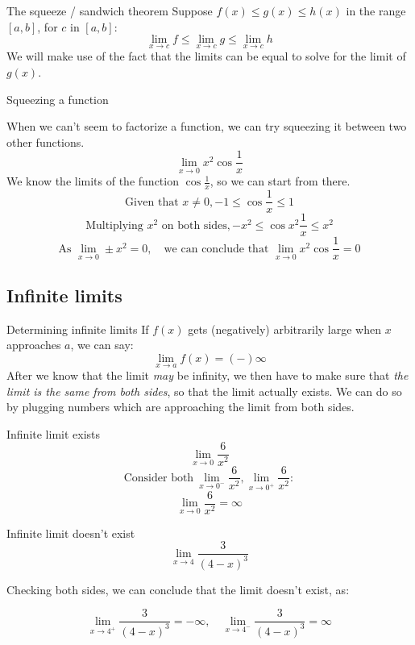 \documentclass{article}
\begin{document}
\begin{theorem}
  {The squeeze / sandwich theorem}
  Suppose $f(x)\le g(x) \le h(x)$ in the range $[a, b]$, for $c$ in $[a, b]$:
  \[\lim_{x\to c}f \le \lim_{x\to c}g \le \lim_{x\to c}h\]
  We will make use of the fact that the limits can be equal to solve for the limit of $g(x)$.
\end{theorem}

\begin{example}
  Squeezing a function

  When we can't seem to factorize a function, we can try squeezing it between two other functions.
  \[\lim_{x\to 0}x^2\cos\frac{1}{x}\]
  We know the limits of the function $\cos \frac{1}{x}$, so we can start from there.
  \[\text{Given that }x\ne 0, -1\le \cos \frac{1}{x} \le 1\]
  \[\text{Multiplying }x^2\text{ on both sides},-x^2\le \cos x^2\frac{1}{x} \le x^2\]
  \[\text{As }\lim_{x\to 0}\pm x^2=0,\quad\text{we can conclude that }\lim_{x\to 0}x^2\cos\frac{1}{x}=0\]
\end{example}

\subsection{Infinite limits}
\begin{knBox}
  {Determining infinite limits}
  If $f(x)$ gets (negatively) arbitrarily large when $x$ approaches $a$, we can say:
  \[\lim_{x\to a}f(x)=(-)\infty\]
  After we know that the limit \emph{may} be infinity, we then have to make sure that \emph{the limit is the same from both sides}, so that the limit actually exists. We can do so by plugging numbers which are approaching the limit from both sides.
\end{knBox}

\begin{minipage}{0.45\textwidth}
  \begin{example}
    Infinite limit exists
    \[\lim_{x\to 0}\frac{6}{x^2}\]
    \[\text{Consider both}\ \lim_{x\to 0^-}\frac{6}{x^2},\lim_{x\to 0^+}\frac{6}{x^2}:\]
    \[\lim_{x\to 0}\frac{6}{x^2}=\infty\]
  \end{example}
\end{minipage}
\hfill
\begin{minipage}{0.45\textwidth}
  \vspace{10pt}
  \begin{example}
    Infinite limit doesn't exist
    \[\lim_{x\to 4}\frac{3}{(4-x)^3}\]
    \begin{center}
      Checking both sides, we can conclude that the limit doesn't exist, as:
    \end{center}
    \[\lim_{x\to 4^+}\frac{3}{(4-x)^3}=-\infty,\quad\lim_{x\to 4^-}\frac{3}{(4-x)^3}=\infty\]
  \end{example}
\end{minipage}
\end{document}
